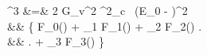 


\bea
{}^3 \Gamma &=& 2  G_v^2 \cos^2\theta_c  \, \pe \Ee (E_0 - \Ee)^2 \dEe \, \dOmegae 
\nonumber\\
&& \times
\left\{
	F_0(\E) 
	+ \Lambda_1 F_1(\E) \hatn \cdot \frac{\vecpe}{\Ee}
	+ \Lambda_2 F_2(\E) 
	\right. \nonumber\\ && \left.
	+ \Lambda_3 F_3(\E) 
\right\}
\label{equation:holstein52}
\eea
